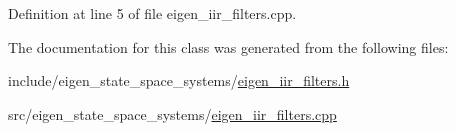 Definition at line 5 of file eigen\+\_\+iir\+\_\+filters.\+cpp.



The documentation for this class was generated from the following files\+:\begin{DoxyCompactItemize}
\item 
include/eigen\+\_\+state\+\_\+space\+\_\+systems/\hyperlink{eigen__iir__filters_8h}{eigen\+\_\+iir\+\_\+filters.\+h}\item 
src/eigen\+\_\+state\+\_\+space\+\_\+systems/\hyperlink{eigen__iir__filters_8cpp}{eigen\+\_\+iir\+\_\+filters.\+cpp}\end{DoxyCompactItemize}
